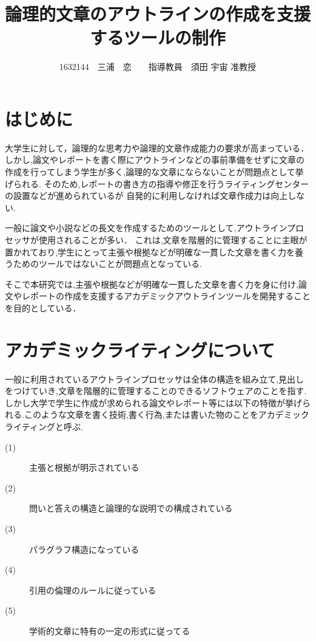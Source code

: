 \documentclass[twocolumn,10pt,a4j]{jsarticle}
\title{論理的文章のアウトラインの作成を支援するツールの制作}
\author{1632144　三浦　恋　　指導教員　須田 宇宙 准教授}
\date{}
\begin{document}
\maketitle

\section{はじめに}

大学生に対して，論理的な思考力や論理的文章作成能力の要求が高まっている．
しかし,論文やレポートを書く際にアウトラインなどの事前準備をせずに文章の作成を行ってしまう学生が多く,論理的な文章にならないことが問題点として挙げられる.
そのため,レポートの書き方の指導や修正を行うライティングセンターの設置などが進められているが
自発的に利用しなければ文章作成力は向上しない.

一般に論文や小説などの長文を作成するためのツールとして,アウトラインプロセッサが使用されることが多い．
これは,文章を階層的に管理することに主眼が置かれており,学生にとって主張や根拠などが明確な一貫した文章を書く力を養うためのツールではないことが問題点となっている.

そこで本研究では,主張や根拠などが明確な一貫した文章を書く力を身に付け,論文やレポートの作成を支援するアカデミックアウトラインツールを開発することを目的としている．

\section{アカデミックライティングについて}
一般に利用されているアウトラインプロセッサは全体の構造を組み立て,見出しをつけていき,文章を階層的に管理することのできるソフトウェアのことを指す.
しかし大学で学生に作成が求められる論文やレポート等には以下の特徴が挙げられる.このような文章を書く技術,書く行為,または書いた物のことをアカデミックライティングと呼ぶ\cite{ren01}.

\begin{description}
  \item[(1)] 主張と根拠が明示されている
  \item[(2)] 問いと答えの構造と論理的な説明での構成されている
  \item[(3)] パラグラフ構造になっている
  \item[(4)] 引用の倫理のルールに従っている
  \item[(5)] 学術的文章に特有の一定の形式に従ってる
\end{description}
\end{document}
